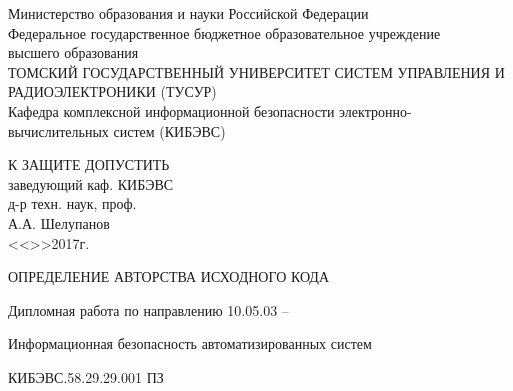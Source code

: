 \newpage
{}

\begin{center}
 Министерство образования и науки Российской Федерации\\
 Федеральное государственное бюджетное образовательное учреждение\\ высшего образования\\
 ТОМСКИЙ ГОСУДАРСТВЕННЫЙ УНИВЕРСИТЕТ СИСТЕМ УПРАВЛЕНИЯ И РАДИОЭЛЕКТРОНИКИ (ТУСУР)\\
 Кафедра комплексной информационной безопасности электронно-\\вычислительных систем (КИБЭВС)\\
\end{center} 

\vfill

\begin{flushright}
\begin{minipage}{0.45\textwidth}
 \begin{flushleft}
  К ЗАЩИТЕ ДОПУСТИТЬ\\
  заведующий каф. КИБЭВС\\
  д-р техн. наук, проф.\\
  \underline{\hspace{3cm}}А.А. Шелупанов \\
  <<\underline{\hspace{1cm}}>>\underline{\hspace{3cm}}2017г.\\
 \end{flushleft}
\end{minipage}
\end{flushright}

\vfill



\begin{center}
ОПРЕДЕЛЕНИЕ АВТОРСТВА ИСХОДНОГО КОДА

Дипломная работа по направлению 10.05.03 --

Информационная безопасность автоматизированных систем

КИБЭВС.58.29.29.001 ПЗ
\end{center}


\vfill


